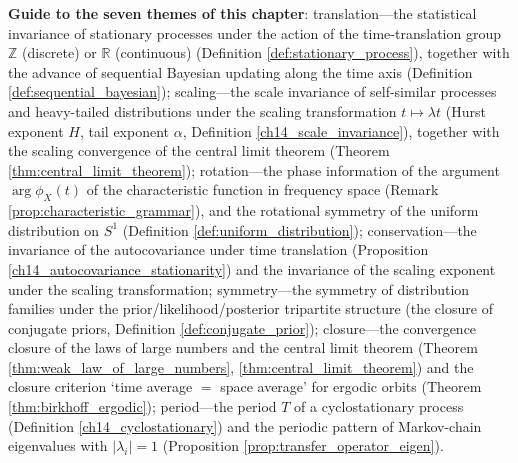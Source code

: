 \begin{remark}
\textbf{Guide to the seven themes of this chapter}: translation---the statistical invariance of stationary processes under the action of the time-translation group $\mathbb{Z}$ (discrete) or $\mathbb{R}$ (continuous) (Definition \ref{def:stationary_process}), together with the advance of sequential Bayesian updating along the time axis (Definition \ref{def:sequential_bayesian}); scaling---the scale invariance of self-similar processes and heavy-tailed distributions under the scaling transformation $t\mapsto\lambda t$ (Hurst exponent $H$, tail exponent $\alpha$, Definition \ref{ch14_scale_invariance}), together with the scaling convergence of the central limit theorem (Theorem \ref{thm:central_limit_theorem}); rotation---the phase information of the argument $\arg\phi_X(t)$ of the characteristic function in frequency space (Remark \ref{prop:characteristic_grammar}), and the rotational symmetry of the uniform distribution on $S^1$ (Definition \ref{def:uniform_distribution}); conservation---the invariance of the autocovariance under time translation (Proposition \ref{ch14_autocovariance_stationarity}) and the invariance of the scaling exponent under the scaling transformation; symmetry---the symmetry of distribution families under the prior/likelihood/posterior tripartite structure (the closure of conjugate priors, Definition \ref{def:conjugate_prior}); closure---the convergence closure of the laws of large numbers and the central limit theorem (Theorem \ref{thm:weak_law_of_large_numbers}, \ref{thm:central_limit_theorem}) and the closure criterion `time average $=$ space average' for ergodic orbits (Theorem \ref{thm:birkhoff_ergodic}); period---the period $T$ of a cyclostationary process (Definition \ref{ch14_cyclostationary}) and the periodic pattern of Markov-chain eigenvalues with $|\lambda_i|=1$ (Proposition \ref{prop:transfer_operator_eigen}).
\end{remark}

